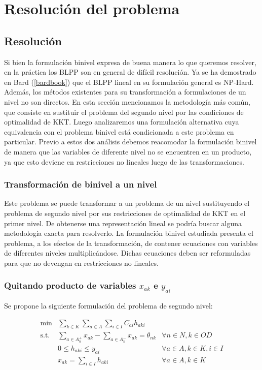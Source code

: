 \documentclass{article}
\begin{document}
  \section{Resolución del problema}

  \subsection{Resolución}

  Si bien la formulación binivel expresa de buena manera lo que queremos resolver, en la práctica los BLPP son en general de difícil resolución. Ya se ha demostrado en Bard (\ref{bardbook}) que el BLPP lineal en su formulación general es NP-Hard. Además, los métodos existentes para su transformación a formulaciones de un nivel no son directos. En esta sección mencionamos la metodología más común, que consiste en sustituir el problema del segundo nivel por las condiciones de optimalidad de KKT. Luego analizaremos una formulación alternativa cuya equivalencia con el problema binivel está condicionada a este problema en particular. Previo a estos dos análisis debemos reacomodar la formulación binivel de manera que las variables de diferente nivel no se encuentren en un producto, ya que esto deviene en restricciones no lineales luego de las transformaciones.

  \subsubsection{Transformación de binivel a un nivel}

  Este problema se puede transformar a un problema de un nivel sustituyendo el problema de segundo nivel por sus restricciones de optimalidad de KKT en el primer nivel. De obtenerse una representación lineal se podría buscar alguna metodología exacta para resolverlo. La formulación binivel estudiada presenta el problema, a los efectos de la transformación, de contener ecuaciones con variables de diferentes niveles multiplicándose. Dichas ecuaciones deben ser reformuladas para que no devengan en restricciones no lineales.

  \subsubsection{Quitando producto de variables $x_{ak}$ e $y_{ai}$}

  Se propone la siguiente formulación del problema de segundo nivel:

  \begin{align}
    \text{min}  & \sum_{k \in K} \sum_{a \in A} \sum_{i \in I} C_{ai} h_{aki}         & \label{eq:subproblemrefeq1} \\
    \text{s.t.} & \sum_{a \in A_n^+} x_{ak} - \sum_{a \in A_n^-} x_{ak} = \theta_{nk} & \forall n \in N, k \in OD \\
                & 0 \leq h_{aki} \leq y_{ai}                                          & \forall a \in A, k \in K, i \in I \\
                & x_{ak} = \sum_{i \in I} h_{aki}                                     & \forall a \in A, k \in K
  \end{align}
\end{document}
